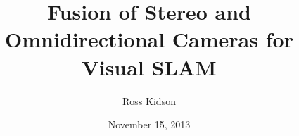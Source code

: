 \newcommand{\thedoctype}{Master's Thesis in Informatik\xspace}
\newcommand{\thetitle}{Fusion of Stereo and Omnidirectional Cameras for Visual SLAM\xspace}
\newcommand{\thetitleGer}{Visueller SLAM mittels Datenfusion aus Stereo- und omnidirektionalen Kameras\xspace}
\newcommand{\theauthor}{Ross Kidson\xspace}
\newcommand{\theplace}{Palo Alto\xspace}
\newcommand{\thedate}{November 15, 2013\xspace}
\newcommand{\thesupervisor}{Juergen Sturm, Ph.D.}
\newcommand{\theadvisor}{Matthias Roland}

\date{\thedate}
\title{\thetitle}
\author{\theauthor}

\newcommand{\footertext}{}
